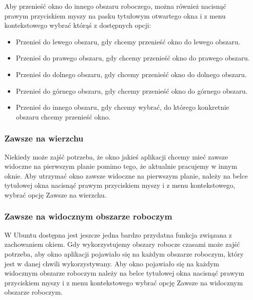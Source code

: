 Aby przenieść okno do innego obszaru roboczego, można również nacisnąć prawym przyciskiem myszy na pasku tytułowym otwartego okna i z menu kontekstowego wybrać którąś z dostępnych opcji:
\begin{itemize}
\item \textcolor{ubuntu_orange}{Przenieś do lewego obszaru}, gdy chcemy przenieść okno do lewego obszaru.
\item \textcolor{ubuntu_orange}{Przenieś do prawego obszaru}, gdy chcemy przenieść okno do prawego obszaru.
\item \textcolor{ubuntu_orange}{Przenieś do dolnego obszaru}, gdy chcemy przenieść okno do dolnego obszaru.
\item \textcolor{ubuntu_orange}{Przenieś do górnego obszaru}, gdy chcemy przenieść okno do górnego obszaru.
\item \textcolor{ubuntu_orange}{Przenieś do innego obszaru}, gdy chcemy wybrać, do którego konkretnie obszaru chcemy przenieść okno.
\end{itemize}

\subsubsection{Zawsze na wierzchu}
Niekiedy może zajść potrzeba, że okno jakieś aplikacji chcemy mieć zawsze widoczne na pierwszym planie pomimo tego, że aktualnie pracujemy w innym oknie. Aby utrzymać okno zawsze widoczne na pierwszym planie, należy na belce tytułowej okna nacisnąć prawym przyciskiem myszy i z menu kontekstowego, wybrać opcję \textcolor{ubuntu_orange}{Zawsze na wierzchu}.

\subsubsection{Zawsze na widocznym obszarze roboczym}
W Ubuntu dostępna jest jeszcze jedna bardzo przydatna funkcja związana z zachowaniem okiem. Gdy wykorzystujemy obszary robocze czasami może zajść potrzeba, aby okno aplikacji pojawiało się na każdym obszarze roboczym, który jest w danej chwili wykorzystywany. Aby okno pojawiało się na każdym widocznym obszarze roboczym należy na belce tytułowej okna nacisnąć prawym przyciskiem myszy i z menu kontekstowego wybrać opcję \textcolor{ubuntu_orange}{Zawsze na widocznym obszarze roboczym}.